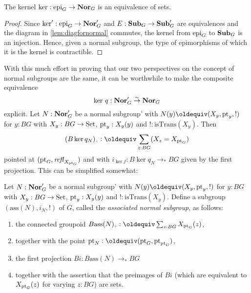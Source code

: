 \begin{corollary}
  \label{cor:normalisnormal}
  The kernel $\ker:\mathrm{epi}_G\to \mathbf{Nor}_G$ is an equivalence of sets.
\end{corollary}
\begin{proof}
  Since $\ker':\mathrm{epi}_G\to\mathbf{Nor}_G'$ and $E:\mathbf{Sub}_G\to\mathbf{Sub}_G'$ are equivalences and the diagram in \cref{lem:diagfornormal} commutes, the kernel from $\mathrm{epi}_G$ to $\mathbf{Sub}_G$ is an injection.  Hence, given a normal subgroup, the type of epimorphisms of which it is the kernel is contractible.
\end{proof}

With this much effort in proving that our two perspectives on the concept of normal subgroups are the same, it can be worthwhile to make the composite equivalence
$$\ker\,q:\mathbf{Nor}_G'\overset\sim\to\mathbf{Nor}_G$$
explicit.   Let $N:\mathbf{Nor}'_G$ be a normal subgroup' with $N(y)\oldequiv (X_y,\pt_y,!)$ for $y:BG$ with $X_y:BG\to\mathord{\mathrm{Set}}$, $\mathrm{pt}_y:X_y(y)$ and $!:\mathrm{isTrans}(X_y)$. 
Then 
$$(B\ker q_N)_\div\defequi\sum_{z:BG}(X_z=X_{\pt_G})$$
pointed at $(\mathrm{pt}_G,\mathop{\mathit{refl}_{X_{\mathrm{pt}_G}}})$ and with $i_{\ker f}:B\ker q_N\to_*BG$ given by the first projection.  This can be simplified somewhat:

\begin{definition}
  \label{def:associatednormal}
  Let $N:\mathbf{Nor}'_G$ be a normal subgroup' with $N(y)\oldequiv (X_y,\pt_y,!)$ for $y:BG$ with $X_y:BG\to\mathord{\mathrm{Set}}$, $\mathrm{pt}_y:X_y(y)$ and $!:\mathrm{isTrans}(X_y)$.  Define a subgroup $(\mathrm{ass}(N),i_N,!)$ of $G$, called the \emph{associated normal subgroup}, as follows:
  \begin{enumerate}
  \item the connected groupoid $B\mathrm{ass}(N)_\div\defequi\sum_{z:BG}X_{\pt_G}(z)$,
  \item together with the point $\pt_N\defequi(\pt_G,\pt_{\pt_G})$,
  \item the first projection $Bi:B\mathrm{ass}(N)\to_*BG$
  \item together with the assertion that the preimages of $Bi$ (which are equivalent to $X_{\mathrm{pt}_G}(z)$ for varying $z:BG$) are sets. 
  \end{enumerate}
\end{definition}


